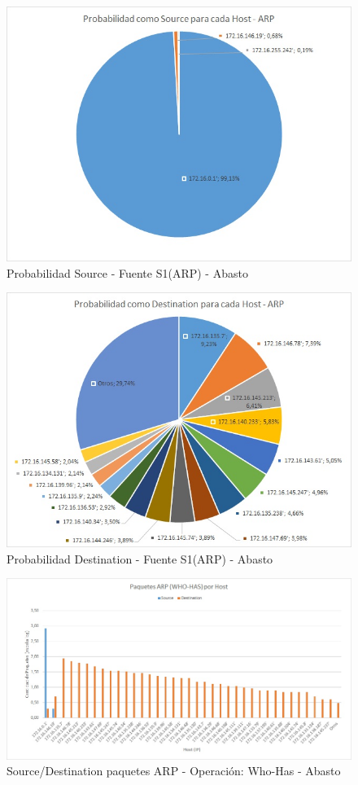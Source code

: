 \begin{figure}[h!]
\centering
\includegraphics[scale=0.7]{./img/proba_src_abasto.jpg}
\caption{Probabilidad Source - Fuente S1(ARP) - Abasto}
\end{figure}

\begin{figure}[h!]
\centering
\includegraphics[scale=0.7]{./img/proba_dst_abasto.jpg}
\caption{Probabilidad Destination - Fuente S1(ARP) - Abasto}
\end{figure}
\newpage

\begin{figure}[h!]
\centering
\includegraphics[scale=0.7]{./img/arp_whoHas_abasto.jpg}
\caption{Source/Destination paquetes ARP - Operación: Who-Has - Abasto}
\end{figure}

